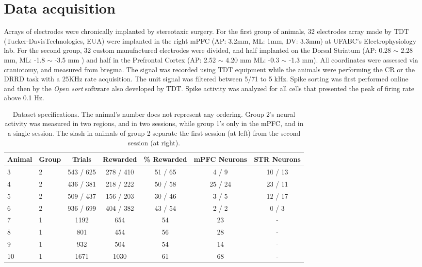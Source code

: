 \chapter{Data acquisition}
\label{chap:acquisition}


Arrays of electrodes were chronically implanted by stereotaxic surgery. For the first group of animals, 32 electrodes array made by TDT (Tucker-DavisTechnologies, EUA) were implanted in the right mPFC (AP: 3.2mm, ML: 1mm, DV: 3.3mm) at UFABC's Electrophysiology lab. For the second group, 32 custom manufactured electrodes were divided, and half implanted on the Dorsal Striatum (AP: 0.28 $\sim$ 2.28 mm, ML: -1.8 $\sim$ -3.5 mm ) and half in the Prefrontal Cortex (AP: 2.52 $\sim$ 4.20 mm ML: -0.3 $\sim$ -1.3 mm). All coordinates were assessed via craniotomy, and measured from bregma.
The signal was recorded  using TDT equipment while the animals were performing the CR or the DRRD task with a 25KHz rate acquisition. The unit signal was filtered between 5/71 to 5 kHz. Spike sorting was first performed online and then by the \textit{Open sort} software also developed by TDT. Spike activity was analyzed for all cells that presented the peak of firing rate above 0.1 Hz. 
			
\begin{table}[htp]
    \centering
    \begin{tabular}{l|l|c|c|c|c|c}
        Animal & Group & Trials & Rewarded & \% Rewarded &  mPFC Neurons & STR Neurons \\\hline
        3 & 2 &  543 / 625  &    278 / 410 &   51 / 65 &       4 / 9    &   10 / 13 \\
        4 & 2 &  436 / 381  &    218 / 222 &  50 / 58  &      25 / 24   &   23 / 11 \\
        5 & 2 &  509 / 437  &    156 / 203 &  30 / 46  &      3 / 5     &   12 / 17 \\
        6 & 2 &  936 / 699  &    404 / 382 &  43 / 54  &      2 / 2     &   0 / 3   \\
        7 & 1 &     1192    &    654       &    54     &     23       &     -     \\
        8 & 1 &      801    &    454       &    56     &     28       &     -     \\
        9 & 1 &      932    &    504       &    54     &     14       &     -     \\
        10& 1 &     1671    &    1030      &    61     &     68       &     -     \\
    \end{tabular}
    \caption[Dataset specifications]{Dataset specifications. The animal's number does not represent any ordering. Group 2's neural activity was measured in two regions, and in two sessions, while group 1's only in the mPFC, and in a single session. The slash in animals of group 2 separate the first session (at left) from the second session (at right).}
    \label{tab:subjects}
\end{table}